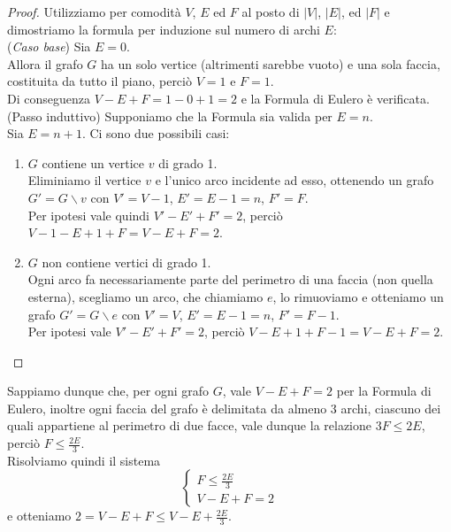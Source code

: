 \documentclass[a4paper,12pt,titlepage]{report}
\begin{document}
    \begin{proof}
        Utilizziamo per comodità $V$, $E$ ed $F$ al posto di $\lvert V \rvert$, $\lvert E \rvert$, ed $\lvert F \rvert$ e dimostriamo la formula per induzione sul numero di archi $E$:
        \\(\emph{Caso base}) Sia $E = 0$. 
        \\Allora il grafo $G$ ha un solo vertice (altrimenti sarebbe vuoto) e una sola faccia, costituita da tutto il piano, perciò $V = 1$ e $F = 1$.	
        \\Di conseguenza $V - E + F = 1 - 0 + 1 = 2$ e la Formula di Eulero è verificata.
        \\(Passo induttivo) Supponiamo che la Formula sia valida per $E = n$.
        \\Sia $E = n + 1$. Ci sono due possibili casi:
        \begin{enumerate}
        	\item $G$ contiene un vertice $v$ di grado 1.
        	\\Eliminiamo il vertice $v$ e l'unico arco incidente ad esso, ottenendo un grafo $G' = G \smallsetminus v$ con $V' = V - 1$, $E' = E - 1 = n$, $F' = F$.
        	\\Per ipotesi vale quindi $V' - E' + F' = 2$, perciò $V - 1 - E + 1 + F = V - E + F = 2$.
        	\item $G$ non contiene vertici di grado 1.
        	\\Ogni arco fa necessariamente parte del perimetro di una faccia (non quella esterna), scegliamo un arco, che chiamiamo $e$, lo rimuoviamo e otteniamo un grafo $G' = G \smallsetminus e$ con $V' = V$, $E' = E - 1 = n$, $F' = F - 1$.
        	\\Per ipotesi vale $V' - E' + F' = 2$, perciò $V - E + 1 + F - 1 = V - E + F = 2$. \qedhere
        \end{enumerate}
    \end{proof}
       Sappiamo dunque che, per ogni grafo $G$, vale $V - E + F = 2$ per la Formula di Eulero, inoltre ogni faccia del grafo è delimitata da almeno 3 archi, ciascuno dei quali appartiene al perimetro di due facce, vale dunque la relazione $3F \leq 2E$, perciò $F \leq \frac{2E}{3}$.
    \\Risolviamo quindi il sistema
    \[
    \begin{cases}
    	F \leq \frac{2E}{3}\\
    	V - E + F = 2
    \end{cases}
    \] 
    e otteniamo $2 = V - E + F \leq V - E + \frac{2E}{3}$.
\end{document}
